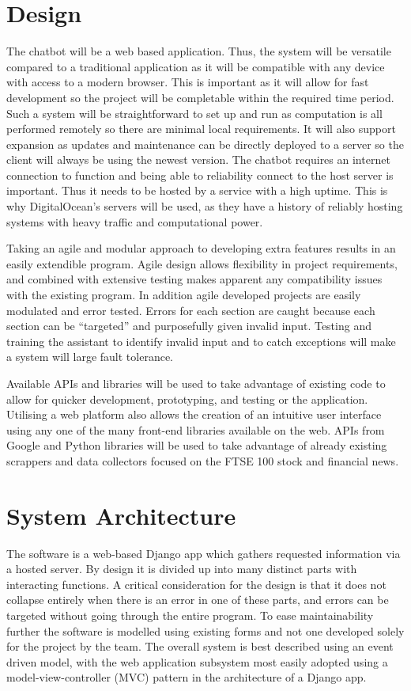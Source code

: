 \documentclass[]{IEEEtran}
\begin{document}
	\section{Design}
	
The chatbot will be a web based application. Thus, the system will be versatile compared to a traditional application as it will be compatible with any device with access to a modern browser. This is important as it will allow for fast development so the project will be completable within the required time period. Such a system will be straightforward to set up and run as computation is all performed remotely so there are minimal local requirements. It will also support expansion as updates and maintenance can be directly deployed to a server so the client will always be using the newest version. The chatbot requires an internet connection to function and being able to reliability connect to the host server is important. Thus it needs to be hosted by a service with a high uptime. This is why DigitalOcean’s servers will be used, as they have a history of reliably hosting systems with heavy traffic and computational power.

Taking an agile and modular approach to developing extra features results in an easily extendible program. Agile design allows flexibility in project requirements, and combined with extensive testing makes apparent any compatibility issues with the existing program. In addition agile developed projects are easily modulated and error tested. Errors for each section are caught because each section can be “targeted” and purposefully given invalid input. Testing and training the assistant to identify invalid input and to catch exceptions will make a system will large fault tolerance. 

Available APIs and libraries will be used to take advantage of existing code to allow for quicker development, prototyping, and testing or the application. Utilising a web platform also allows the creation of an intuitive user interface using any one of the many front-end libraries available on the web. APIs from Google and Python libraries will be used to take advantage of already existing scrappers and data collectors focused on the FTSE 100 stock and financial news.


	\section{System Architecture}
The software is a web-based Django app which gathers requested information via a hosted server. By design it is divided up into many distinct parts with interacting functions. A critical consideration for the design is that it does not collapse entirely when there is an error in one of these parts, and errors can be targeted without going through the entire program. To ease maintainability further the software is modelled using existing forms and not one developed solely for the project by the team. The overall system is best described using an event driven model, with the web application subsystem most easily adopted using a model-view-controller (MVC) pattern in the architecture of a Django app. 
\end{document}
